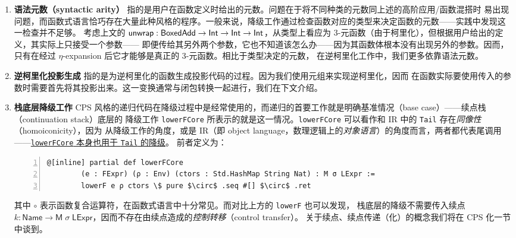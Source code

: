 \documentclass[a4paper, 11pt]{article}
\theoremstyle{remark}\newtheorem*{remark}{Remark}
\theoremstyle{definition}\newtheorem*{definition}{Definition}
\begin{document}
\begin{enumerate}
    此外 Lean 亦有 $\eta$-expansion 导致语义不一致的问题，但由于危害不大，其开发者目前也不准备对此做任何处理。
    见脚注笔者发表的 Proofexchange 帖子\footnote{\url{https://proofassistants.stackexchange.com/a/4424}}，
    以及帖子中 Lean 类型论设计者的回答和 GitHub issue \texttt{\#5908}\footnote{\url{https://github.com/leanprover/lean4/issues/5908}}.
  \item {\bf 语法元数（syntactic arity）} 指的是用户在函数定义时给出的元数。问题在于将不同种类的元数同上述的高阶应用/函数混搭时
    易出现问题，而函数式语言恰巧存在大量此种风格的程序。一般来说，降级工作通过检查函数对应的类型来决定函数的元数——实践中发现这一检查并不足够。
    考虑上文的 $\mathsf{unwrap} : \mathsf{BoxedAdd}\to\mathsf{Int}\to\mathsf{Int}\to\mathsf{Int}$，从类型上看应为 3-元函数（由于柯里化），但根据用户给出的定义，其实际上只接受一个参数——
    即便传给其另外两个参数，它也不知道该怎么办——因为其函数体根本没有出现另外的参数。因而，只有在经过 $\eta$-expansion 后它才能够是真正的 3-元函数。相比于类型决定的元数，
    在逆柯里化工作中，我们更多依靠语法元数。
  \item {\bf 逆柯里化投影生成} 指的是为逆柯里化的函数生成投影代码的过程。因为我们使用元组来实现逆柯里化，因而
    在函数实际要使用传入的参数时需要首先将其投影出来。这一变换通常与闭包转换一起进行，我们在下文介绍。

  \item {\bf 栈底层降级工作} CPS 风格的递归代码在降级过程中是经常使用的，而递归的首要工作就是明确基准情况（base case）——续点栈（continuation stack）底层的
    降级工作 \texttt{lowerFCore} 所表示的就是这一情况。\texttt{lowerFCore} 可以看作和 IR 中的 \texttt{Tail} 存在\emph{同像性}（homoiconicity），因为
    从降级工作的角度，或是 IR（即 object language，数理逻辑上的\emph{对象语言}）的角度而言，两者都代表尾调用——\underline{\texttt{lowerFCore} 本身也用于 \texttt{Tail} 的降级}。
    前者定义为：
    \begin{Verbatim}[commandchars=\\\{\},codes={\catcode`$=3},numbers=left]
      @[inline] partial def lowerFCore
        (e : FExpr) (ρ : Env) (ctors : Std.HashMap String Nat) : M σ LExpr :=
        lowerF e ρ ctors \$ pure $\circ$ .seq #[] $\circ$ .ret
    \end{Verbatim}
    其中 $\circ$ 表示函数复合运算符，在函数式语言中十分常见。而对比上方的 \texttt{lowerF} 也可以发现，
    栈底层的降级不需要传入续点 $k :\mathsf{Name}\to\mathsf{M}\;\sigma\;\mathsf{LExpr}$，因而不存在由续点造成的\emph{控制转移}（control transfer）。
    关于续点、续点传递（化）的概念我们将在 CPS 化一节中谈到。
\end{enumerate}
\end{document}
